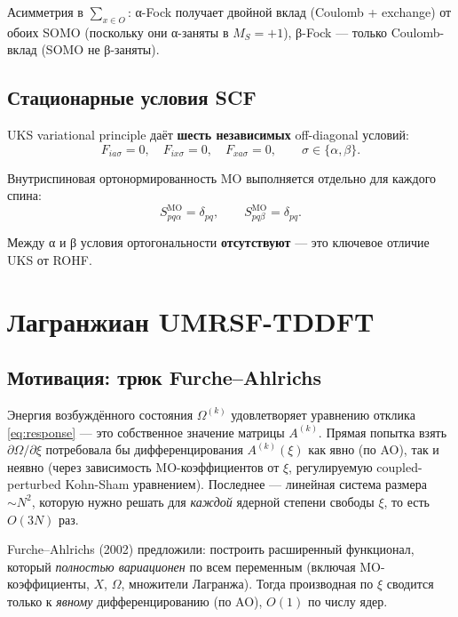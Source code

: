\documentclass[11pt, a4paper]{article}
\theoremstyle{definition}
\newcommand{\MO}{\text{MO}}
\begin{document}
Асимметрия в $\sum_{x \in O}$: α-Fock получает двойной вклад (Coulomb + exchange) от обоих SOMO (поскольку они α-заняты в $M_S = +1$), β-Fock --- только Coulomb-вклад (SOMO не β-заняты).

\subsection{Стационарные условия SCF}

UKS variational principle даёт \textbf{шесть независимых} off-diagonal условий:
\begin{equation}
    F_{ia\sigma} = 0, \quad F_{ix\sigma} = 0, \quad F_{xa\sigma} = 0, \qquad \sigma \in \{\alpha, \beta\}.
    \label{eq:SCFstationary}
\end{equation}

Внутриспиновая ортонормированность MO выполняется отдельно для каждого спина:
\begin{equation}
    S^{\MO}_{pq\alpha} = \delta_{pq}, \qquad S^{\MO}_{pq\beta} = \delta_{pq}.
    \label{eq:MOortho}
\end{equation}

Между α и β условия ортогональности \textbf{отсутствуют} --- это ключевое отличие UKS от ROHF.

\section{Лагранжиан UMRSF-TDDFT}
\label{sec:lagrangian}

\subsection{Мотивация: трюк Furche--Ahlrichs}

Энергия возбуждённого состояния $\Omega^{(k)}$ удовлетворяет уравнению отклика \eqref{eq:response} --- это собственное значение матрицы $A^{(k)}$. Прямая попытка взять $\partial \Omega/\partial \xi$ потребовала бы дифференцирования $A^{(k)}(\xi)$ как явно (по AO), так и неявно (через зависимость MO-коэффициентов от $\xi$, регулируемую coupled-perturbed Kohn-Sham уравнением). Последнее --- линейная система размера $\sim N^2$, которую нужно решать для \emph{каждой} ядерной степени свободы $\xi$, то есть $O(3N)$ раз.

Furche--Ahlrichs (2002) предложили: построить расширенный функционал, который \emph{полностью вариационен} по всем переменным (включая MO-коэффициенты, $X$, $\Omega$, множители Лагранжа). Тогда производная по $\xi$ сводится только к \emph{явному} дифференцированию (по AO), $O(1)$ по числу ядер.
\end{document}
